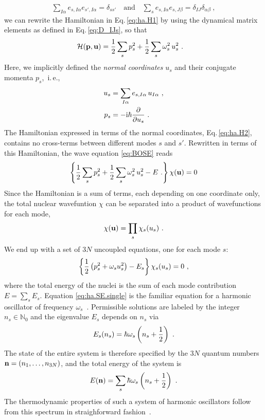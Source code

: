 \begin{align}
	\sum_{I \alpha} e_{s, I \alpha} e_{s', I \alpha} = \delta_{s s'}
	\quad \text{and} \quad
	\sum_{s} e_{s, I \alpha} e_{s, J \beta} = \delta_{IJ} \delta_{\alpha \beta}~,
	\label{eq:completeness.e_s}
\end{align}
we can rewrite the Hamiltonian in Eq.\,\eqref{eq:ha.H1} by using the dynamical matrix elements as defined in Eq.\,\eqref{eq:D_IJs}, so that
\begin{align}
	\mathcal{H}( {\bf p},  {\bf u})
		&= \halb \sum_s p_s^2 + 
		\halb \sum_{s} \omega_s^2	\, u_s^2~.
\label{eq:ha.H2}
\end{align}
Here, we implicitly defined the \emph{normal coordinates} $u_s$ and their conjugate momenta $p_s$,~i.\,e.,
\begin{align}
	u_s
		&= \sum_{I \alpha} e_{s, I \alpha} \, u_{I \alpha}~,
		\label{eq:u_s} \\
	p_s
		&= -\im \hbar \frac{\partial}{\partial u_s}~.
		\label{eq:p_s}
\end{align}
The Hamiltonian expressed in terms of the normal coordinates, Eq.\,\eqref{eq:ha.H2}, contains no cross-terms between different modes $s$ and $s'$. Rewritten in terms of this Hamiltonian, the wave equation \eqref{eq:BOSE} reads
\begin{align}
	\left\{
		\halb \sum_s p_s^2 + \halb \sum_{s} \omega_s^2	\, u_s^2 - E~.
	\right\} \chi ({\bf u})
	= 0
	\label{eq:ha.SE.2}
\end{align}
Since the Hamiltonian is a sum of terms, each depending on one coordinate only, the total nuclear wavefuntion $\chi$ can be separated into a product of wavefunctions for each mode,
\begin{align}
	\chi({\bf u}) = \prod_{s} \chi_s (u_s)~.
	\label{eq:ha.chi}
\end{align}
We end up with a set of $3N$ uncoupled equations, one for each mode $s$:
\begin{align}
	\left\{	\halb \left( p_s^2 + \omega_s u_s^2 \right)	- E_s	\right\} \chi_s (u_s)
		= 0~,
	\label{eq:ha.SE.single}
\end{align}
where the total energy of the nuclei is the sum of each mode contribution $E = \sum_s E_s$. Equation \eqref{eq:ha.SE.single} is the familiar equation for a harmonic oscillator of frequency $\omega_s$~\cite{Dirac1981}. Permissible solutions are labeled by the integer $n_s \in \mathds N_0$ and the eigenvalue $E_s$ depends on $n_s$ via
\begin{align}
	E_s(n_s) = \hbar \omega_s \left( n_s + \halb \right)~.
	\label{eq:E_s}
\end{align}
The state of the entire system is therefore specified by the $3N$ quantum numbers ${\bf n} = (n_1, \ldots, n_{3N})$, and the total energy of the system is
\begin{align}
	E ({\bf n}) = \sum_s \hbar \omega_s \left( n_s + \frac{1}{2} \right)~.
\end{align}
The thermodynamic properties of such a system of harmonic oscillators follow from this spectrum in straighforward fashion~\cite{BornHuang}.


